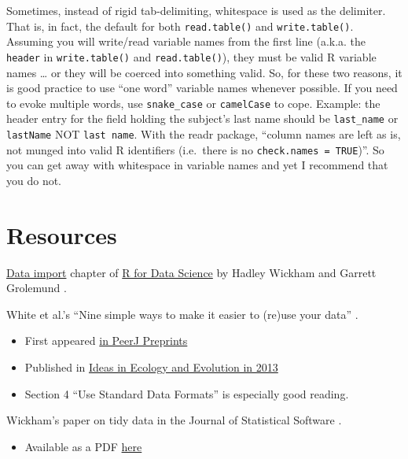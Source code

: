\documentclass[
]{book}
\providecommand{\tightlist}{%
  \setlength{\itemsep}{0pt}\setlength{\parskip}{0pt}}
\begin{document}
Sometimes, instead of rigid tab-delimiting, whitespace is used as the delimiter. That is, in fact, the default for both \texttt{read.table()} and \texttt{write.table()}. Assuming you will write/read variable names from the first line (a.k.a. the \texttt{header} in \texttt{write.table()} and \texttt{read.table()}), they must be valid R variable names \ldots{} or they will be coerced into something valid. So, for these two reasons, it is good practice to use ``one word'' variable names whenever possible. If you need to evoke multiple words, use \texttt{snake\_case} or \texttt{camelCase} to cope. Example: the header entry for the field holding the subject's last name should be \texttt{last\_name} or \texttt{lastName} NOT \texttt{last\ name}. With the readr package, ``column names are left as is, not munged into valid R identifiers (i.e.~there is no \texttt{check.names\ =\ TRUE})''. So you can get away with whitespace in variable names and yet I recommend that you do not.

\hypertarget{resources}{%
\section{Resources}\label{resources}}

\href{http://r4ds.had.co.nz/data-import.html}{Data import} chapter of \href{https://r4ds.had.co.nz}{R for Data Science} by Hadley Wickham and Garrett Grolemund \citeyearpar{wickham2016}.

White et al.'s ``Nine simple ways to make it easier to (re)use your data'' \citeyearpar{white2013}.

\begin{itemize}
\tightlist
\item
  First appeared \href{https://doi.org/10.7287/peerj.preprints.7v2}{in PeerJ Preprints}
\item
  Published in \href{https://ojs.library.queensu.ca/index.php/IEE/article/view/4608}{Ideas in Ecology and Evolution in 2013}
\item
  Section 4 ``Use Standard Data Formats'' is especially good reading.
\end{itemize}

Wickham's paper on tidy data in the Journal of Statistical Software \citeyearpar{wickham2014}.

\begin{itemize}
\tightlist
\item
  Available as a PDF \href{http://vita.had.co.nz/papers/tidy-data.pdf}{here}
\end{itemize}
\end{document}
